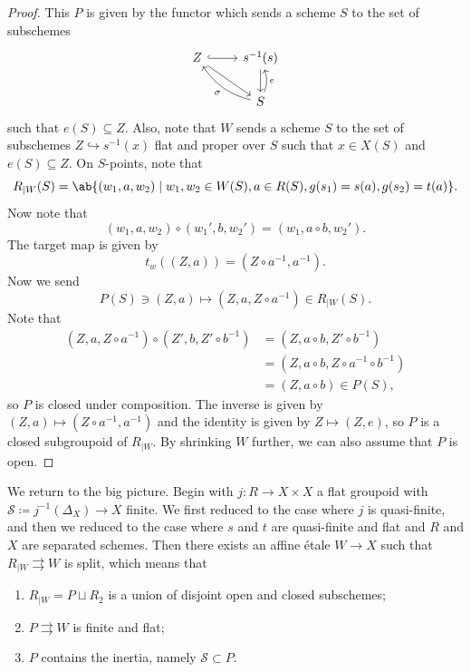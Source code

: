 \documentclass{amsart}
\theoremstyle{definition}
\theoremstyle{remark}
\theoremstyle{plain}
\theoremstyle{definition}
\theoremstyle{remark}
\newcommand{\mc}[1]{\mathcal{#1}}
\newcommand{\1}{\mathbf{1}}
\newcommand{\2}{\mathbf{2}}
\newcommand{\3}{\mathbf{3}}
\begin{document}
\begin{proof}
    This \(P\) is given by the functor which sends a scheme \(S\) to the set of subschemes
    \begin{equation*}
    \begin{tikzcd}
        Z \ar[hookrightarrow]{r} \ar{dr} & s^{-1}(s) \ar{d} \\
        & S \ar[bend left=20]{ul}{\sigma} \ar[bend right=20]{u}[swap]{e}
    \end{tikzcd}
    \end{equation*}
    such that \(e(S) \subseteq Z\). Also, note that \(W\) sends a scheme \(S\) to the set of subschemes \(Z \hookrightarrow s^{-1}(x)\) flat and proper over \(S\) such that \(x \in X(S)\) and \(e(S) \subseteq Z\). On \(S\)-points, note that
    \[ R_{|W}(S) = \ab\{ (w_1 ,a, w_2) \mid w_1, w_2 \in W(S), a \in R(S), g(s_1) = s(a), g(s_2) = t(a)\}. \]
    Now note that
    \[ (w_1, a, w_2) \circ (w_1', b, w_2') = (w_1, a \circ b, w_2'). \]
    The target map is given by
    \[ t_w((Z, a)) = (Z \circ a^{-1}, a^{-1}). \]
    Now we send
    \[ P(S) \ni (Z, a) \mapsto (Z, a, Z \circ a^{-1}) \in R_{|W}(S). \]
    Note that
    \begin{align*}
        (Z, a, Z \circ a^{-1}) \circ (Z', b, Z' \circ b^{-1}) &= (Z, a \circ b, Z' \circ b^{-1}) \\
        &= (Z, a \circ b, Z \circ a^{-1} \circ b^{-1}) \\
        &= (Z, a \circ b) \in P(S),
    \end{align*}
    so \(P\) is closed under composition. The inverse is given by \((Z, a) \mapsto (Z \circ a^{-1}, a^{-1})\) and the identity is given by \(Z \mapsto (Z, e)\), so \(P\) is a closed subgroupoid of \(R_{|W}\). By shrinking \(W\) further, we can also assume that \(P\) is open.
\end{proof}


We return to the big picture. Begin with \(j \colon R \to X \times X\) a flat groupoid with \(\mc{S} \coloneqq j^{-1}(\Delta_X) \to X\) finite. We first reduced to the case where \(j\) is quasi-finite, and then we reduced to the case where \(s\) and \(t\) are quasi-finite and flat and \(R\) and \(X\) are separated schemes. Then there exists an affine \'etale \(W \to X\) such that \(R_{|W} \rightrightarrows W\) is split, which means that
\begin{enumerate}
    \item \(R_{|W} = P \sqcup R_2\) is a union of disjoint open and closed subschemes;
    \item \(P \rightrightarrows W\) is finite and flat;
    \item \(P\) contains the inertia, namely \(\mc{S} \subset P\).
\end{enumerate}
\end{document}
